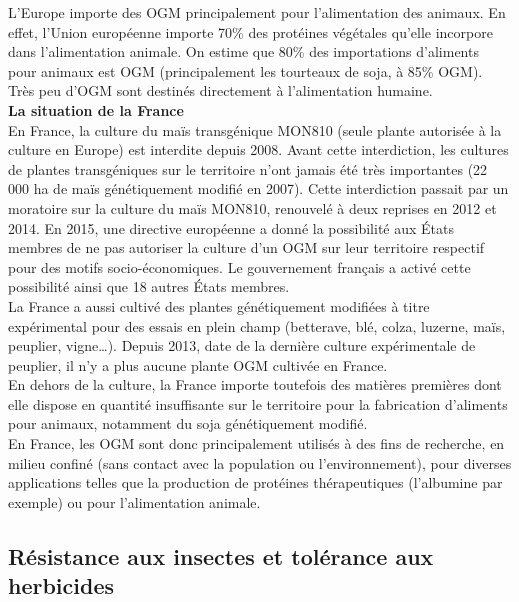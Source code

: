 \documentclass[8pt]{article}
\begin{document}
L’Europe importe des OGM principalement pour l’alimentation des animaux. En effet, l’Union européenne importe 70\% des protéines végétales qu’elle incorpore dans l’alimentation animale. On estime que 80\% des importations d’aliments pour animaux est OGM (principalement les tourteaux de soja, à 85\% OGM). Très peu d’OGM sont destinés directement à l’alimentation humaine.\\

\textbf{La situation de la France}\\

En France, la culture du maïs transgénique MON810 (seule plante autorisée à la culture en Europe) est interdite depuis 2008. Avant cette interdiction, les cultures de plantes transgéniques sur le territoire n’ont jamais été très importantes (22 000 ha de maïs génétiquement modifié en 2007). Cette interdiction passait par un moratoire sur la culture du maïs MON810, renouvelé à deux reprises en 2012 et 2014. En 2015, une directive européenne  a donné la possibilité aux États membres de ne pas autoriser la culture d’un OGM sur leur territoire respectif pour des motifs socio-économiques. Le gouvernement français a activé cette possibilité ainsi que 18 autres États membres.\\

La France a aussi cultivé des plantes génétiquement modifiées à titre expérimental pour des essais en plein champ (betterave, blé, colza, luzerne, maïs, peuplier, vigne…). Depuis 2013, date de la dernière culture expérimentale de peuplier, il n’y a plus aucune plante OGM cultivée en France.\\

En dehors de la culture, la France importe toutefois des matières premières dont elle dispose en quantité insuffisante sur le territoire pour la fabrication d’aliments pour animaux, notamment du soja génétiquement modifié.\\

En France, les OGM sont donc principalement utilisés à des fins de recherche, en milieu confiné (sans contact avec la population ou l’environnement), pour diverses applications telles que la production de protéines thérapeutiques (l’albumine par exemple) ou pour l’alimentation animale.

\newpage
\subsection{Résistance aux insectes et tolérance aux herbicides}
\label{sec:resistance}
\end{document}
